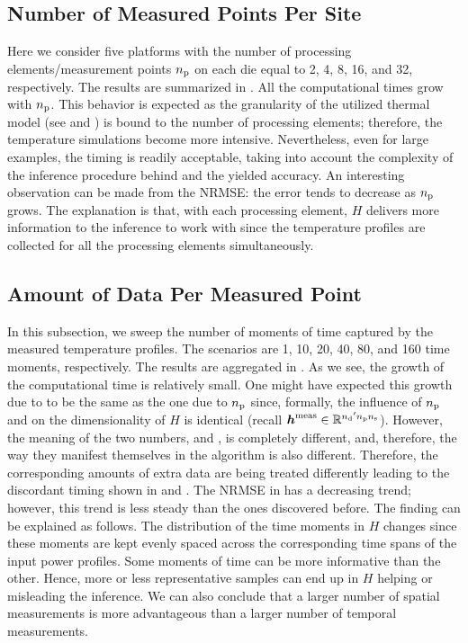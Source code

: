 \subsection{Number of Measured Points Per Site}

Here we consider five platforms with the number of processing
elements/measurement points ${n_\mathrm{p}}$ on each die equal to 2, 4, 8, 16, and 32,
respectively. The results are summarized in . All the
computational times grow with ${n_\mathrm{p}}$. This behavior is expected as the
granularity of the utilized thermal model (see  and
\cite{ukhov2012}) is bound to the number of processing elements; therefore, the
temperature simulations become more intensive. Nevertheless, even for large
examples, the timing is readily acceptable, taking into account the complexity
of the inference procedure behind and the yielded accuracy. An interesting
observation can be made from the NRMSE: the error tends to decrease as ${n_\mathrm{p}}$
grows. The explanation is that, with each processing element, $H$ delivers
more information to the inference to work with since the temperature profiles
are collected for all the processing elements simultaneously.

\subsection{Amount of Data Per Measured Point}

In this subsection, we sweep the number of moments of time \ns captured by the
measured temperature profiles. The scenarios are 1, 10, 20, 40, 80, and 160 time
moments, respectively. The results are aggregated in
. As we see, the growth of the computational time is
relatively small. One might have expected this growth due to \ns to be the same
as the one due to ${n_\mathrm{p}}$ since, formally, the influence of ${n_\mathrm{p}}$ and \ns on the
dimensionality of $H$ is identical (recall $\boldsymbol{h}^{\mathrm{meas}} \in \mathbb{R}^{{n_\mathrm{d}}' {n_\mathrm{p}}
{n_\mathrm{s}}}$). However, the meaning of the two numbers, \np and \ns, is completely
different, and, therefore, the way they manifest themselves in the algorithm is
also different. Therefore, the corresponding amounts of extra data are being
treated differently leading to the discordant timing shown in
 and . The NRMSE in
 has a decreasing trend; however, this trend is less
steady than the ones discovered before. The finding can be explained as follows.
The distribution of the time moments in $H$ changes since these moments are kept
evenly spaced across the corresponding time spans of the input power profiles.
Some moments of time can be more informative than the other. Hence, more or less
representative samples can end up in $H$ helping or misleading the inference. We
can also conclude that a larger number of spatial measurements is more
advantageous than a larger number of temporal measurements.

